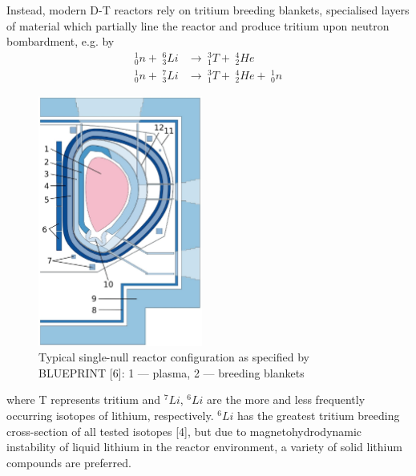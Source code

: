 Instead, modern D-T reactors rely on tritium breeding blankets, specialised layers of material which partially line the reactor and produce tritium upon neutron bombardment, e.g. by 
\begin{align}
    ^1_0n + \hspace{3pt} ^6_3Li &\rightarrow \hspace{3pt} ^3_1T + \hspace{3pt} ^4_2He \\
    ^1_0n + \hspace{3pt} ^7_3Li &\rightarrow \hspace{3pt} ^3_1T + \hspace{3pt} ^4_2He + \hspace{3pt} ^1_0n
\end{align}
\begin{figure}
  \vspace{-20pt}
  \begin{center}
    \includegraphics[width=0.48\textwidth]{fig1_tokamakdiagram.png}
  \end{center}
  \caption{Typical single-null reactor configuration as specified by BLUEPRINT [6]: 1 — plasma,
2 — breeding blankets }
\label{fig:tokamak}
\end{figure}
where T represents tritium and $^7Li$, $^6Li$ are the more and less frequently occurring isotopes of lithium, respectively. $^6Li$ has the greatest tritium breeding cross-section of all tested isotopes [4], but due to magnetohydrodynamic instability of liquid lithium in the reactor environment, a variety of solid lithium compounds are preferred.

